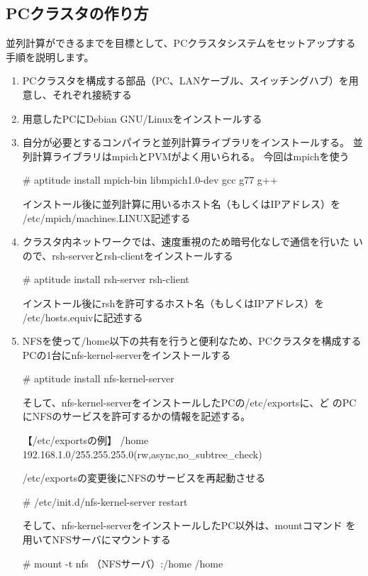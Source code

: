 \documentclass[mingoth,a4paper]{jsarticle}
\begin{document}
\subsection{PCクラスタの作り方}
並列計算ができるまでを目標として、PCクラスタシステムをセットアップする手順を説明します。
\begin{enumerate}
\item PCクラスタを構成する部品（PC、LANケーブル、スイッチングハブ）を用意し、それぞれ接続する
\item 用意したPCにDebian GNU/Linuxをインストールする
\item 自分が必要とするコンパイラと並列計算ライブラリをインストールする。
      並列計算ライブラリはmpichとPVMがよく用いられる。
      今回はmpichを使う
\begin{commandline}
 # aptitude install mpich-bin libmpich1.0-dev gcc g77 g++
\end{commandline}
      インストール後に並列計算に用いるホスト名（もしくはIPアドレス）を
      /etc/mpich/machines.LINUX記述する
\item クラスタ内ネットワークでは、速度重視のため暗号化なしで通信を行いた
      いので、rsh-serverとrsh-clientをインストールする
\begin{commandline}
 # aptitude install rsh-server rsh-client
\end{commandline}
      インストール後にrshを許可するホスト名（もしくはIPアドレス）を
      /etc/hosts.equivに記述する
\item NFSを使って/home以下の共有を行うと便利なため、PCクラスタを構成する
      PCの1台にnfs-kernel-serverをインストールする
\begin{commandline}
 # aptitude install nfs-kernel-server
\end{commandline}
      そして、nfs-kernel-serverをインストールしたPCの/etc/exportsに、ど
      のPCにNFSのサービスを許可するかの情報を記述する。
\begin{commandline}
 【/etc/exportsの例】
 /home   192.168.1.0/255.255.255.0(rw,async,no_subtree_check)
\end{commandline}
      /etc/exportsの変更後にNFSのサービスを再起動させる
\begin{commandline}
 # /etc/init.d/nfs-kernel-server restart
\end{commandline}
      そして、nfs-kernel-serverをインストールしたPC以外は、mountコマンド
      を用いてNFSサーバにマウントする
\begin{commandline}
 # mount -t nfs （NFSサーバ）:/home /home
\end{commandline}

\end{enumerate}
\end{document}
